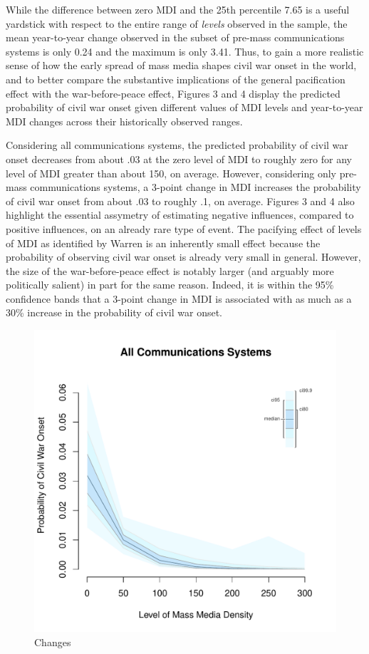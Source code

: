 \documentclass[11pt,article,oneside]{memoir}
\makeatletter
\def\maxwidth{\ifdim\Gin@nat@width>\linewidth\linewidth
\else\Gin@nat@width\fi}
\let\Oldincludegraphics\includegraphics
\renewcommand{\includegraphics}[1]{\Oldincludegraphics[width=\maxwidth]{#1}}
\makeatother
\begin{document}
While the difference between zero MDI and the 25th percentile 7.65 is a
useful yardstick with respect to the entire range of \emph{levels}
observed in the sample, the mean year-to-year change observed in the
subset of pre-mass communications systems is only 0.24 and the maximum
is only 3.41. Thus, to gain a more realistic sense of how the early
spread of mass media shapes civil war onset in the world, and to better
compare the substantive implications of the general pacification effect
with the war-before-peace effect, Figures 3 and 4 display the predicted
probability of civil war onset given different values of MDI levels and
year-to-year MDI changes across their historically observed ranges.

Considering all communications systems, the predicted probability of
civil war onset decreases from about .03 at the zero level of MDI to
roughly zero for any level of MDI greater than about 150, on average.
However, considering only pre-mass communications systems, a 3-point
change in MDI increases the probability of civil war onset from about
.03 to roughly .1, on average. Figures 3 and 4 also highlight the
essential assymetry of estimating negative influences, compared to
positive influences, on an already rare type of event. The pacifying
effect of levels of MDI as identified by Warren is an inherently small
effect because the probability of observing civil war onset is already
very small in general. However, the size of the war-before-peace effect
is notably larger (and arguably more politically salient) in part for
the same reason. Indeed, it is within the 95\% confidence bands that a
3-point change in MDI is associated with as much as a 30\% increase in
the probability of civil war onset.

\clearpage

\begin{figure} 
\includegraphics{figure/mdi_effect.pdf} 
\caption{Changes} 
\label{myFigur} 
\end{figure}
\end{document}
